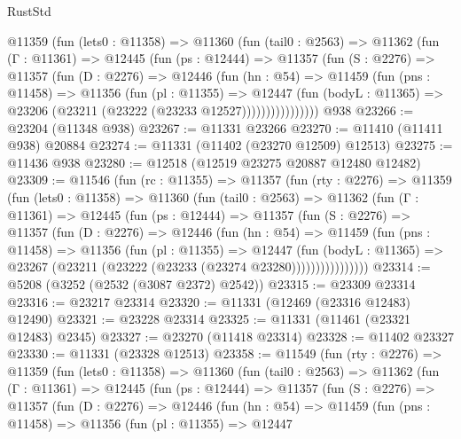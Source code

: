 \begin{lexlean}{RustStd}
\begin{coremodule}
        @11359
          (fun (lets0 : @11358) =>
          @11360
            (fun (tail0 : @2563) =>
            @11362
              (fun (Γ : @11361) =>
              @12445
                (fun (ps : @12444) =>
                @11357
                  (fun (S : @2276) =>
                  @11357
                    (fun (D : @2276) =>
                    @12446
                      (fun (hn : @54) =>
                      @11459
                        (fun (pns : @11458) =>
                        @11356
                          (fun (pl : @11355) =>
                          @12447
                            (fun (bodyL : @11365) =>
                            @23206 (@23211 (@23222 (@23233 @12527))))))))))))))))
    @938
@23266 := @23204 (@11348 @938)
@23267 := @11331 @23266
@23270 := @11410 (@11411 @938) @20884
@23274 := @11331 (@11402 (@23270 @12509) @12513)
@23275 := @11436 @938
@23280 := @12518 (@12519 @23275 @20887 @12480 @12482)
@23309 := @11546
    (fun (rc : @11355) =>
    @11357
      (fun (rty : @2276) =>
      @11359
        (fun (lets0 : @11358) =>
        @11360
          (fun (tail0 : @2563) =>
          @11362
            (fun (Γ : @11361) =>
            @12445
              (fun (ps : @12444) =>
              @11357
                (fun (S : @2276) =>
                @11357
                  (fun (D : @2276) =>
                  @12446
                    (fun (hn : @54) =>
                    @11459
                      (fun (pns : @11458) =>
                      @11356
                        (fun (pl : @11355) =>
                        @12447
                          (fun (bodyL : @11365) =>
                          @23267 (@23211 (@23222 (@23233 (@23274 @23280))))))))))))))))
@23314 := @5208 (@3252 (@2532 (@3087 @2372) @2542))
@23315 := @23309 @23314
@23316 := @23217 @23314
@23320 := @11331 (@12469 (@23316 @12483) @12490)
@23321 := @23228 @23314
@23325 := @11331 (@11461 (@23321 @12483) @2345)
@23327 := @23270 (@11418 @23314)
@23328 := @11402 @23327
@23330 := @11331 (@23328 @12513)
@23358 := @11549
    (fun (rty : @2276) =>
    @11359
      (fun (lets0 : @11358) =>
      @11360
        (fun (tail0 : @2563) =>
        @11362
          (fun (Γ : @11361) =>
          @12445
            (fun (ps : @12444) =>
            @11357
              (fun (S : @2276) =>
              @11357
                (fun (D : @2276) =>
                @12446
                  (fun (hn : @54) =>
                  @11459
                    (fun (pns : @11458) =>
                    @11356
                      (fun (pl : @11355) =>
                      @12447

\end{coremodule}
\end{lexlean}
